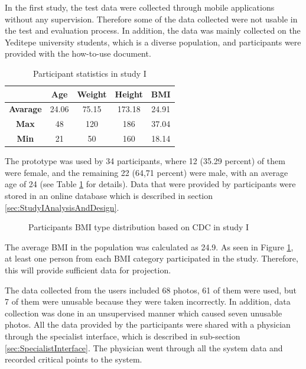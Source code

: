 In the first study, the test data were collected through mobile applications without any supervision. Therefore some of the data collected were not usable in the test and evaluation process. In addition, the data was mainly collected on the Yeditepe university students, which is a diverse population, and participants were provided with the how-to-use document.

\begin{table}[htbp]
\begin{center}
\caption{Participant statistics in study I}
\vspace{23pt}
      \begin{tabular}{|c|c|c|c|c|} \hline
          & \textbf{Age} & \textbf{Weight} & \textbf{Height} & \textbf{BMI} \\ \hline
        \textbf{Avarage} & 24.06 & 75.15 & 173.18 & 24.91 \\ \hline
        \textbf{Max} & 48 & 120 & 186 & 37.04 \\ \hline
        \textbf{Min} & 21 & 50 & 160 & 18.14 \\ \hline
    \end{tabular}
\label{tab:StudyIParticipantStatistics}
\end{center}
\end{table}

The prototype was used by 34 participants, where 12 (35.29 percent) of them were female, and the remaining 22 (64,71 percent) were male, with an average age of 24 (see Table \ref{tab:StudyIParticipantStatistics} for details). Data that were provided by participants were stored in an online database which is described in section \ref{sec:StudyIAnalysisAndDesign}. 

\begin{figure}[htbp]
\centering
{}
\caption{Participants BMI type distribution based on CDC in study I}
\label{fig:StudyIParticipantsBMITypeDistribution}
\end{figure}

The average BMI in the population was calculated as 24.9. As seen in Figure \ref{fig:StudyIParticipantsBMITypeDistribution}, at least one person from each BMI category participated in the study. Therefore, this will provide sufficient data for projection.

The data collected from the users included 68 photos, 61 of them were used, but 7 of them were unusable because they were taken incorrectly. In addition, data collection was done in an unsupervised manner which caused seven unusable photos. All the data provided by the participants were shared with a physician through the specialist interface, which is described in sub-section \ref{sec:SpecialistInterface}. The physician went through all the system data and recorded critical points to the system.

